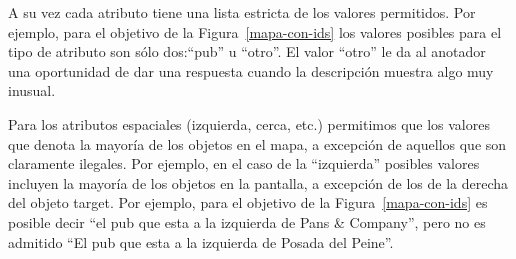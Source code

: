 A su vez cada atributo tiene una lista estricta de los valores permitidos. Por ejemplo, para el objetivo de la Figura~\ref{mapa-con-ids} los valores posibles para el tipo de atributo son s\'olo dos:``pub'' u ``otro''. El valor ``otro'' le da al anotador una oportunidad de dar una respuesta cuando la descripci\'on muestra algo muy inusual.

Para los atributos espaciales (izquierda, cerca, etc.) permitimos que los valores que denota la mayor\'{i}a de los objetos en el mapa, a excepci\'on de aquellos que son claramente ilegales. Por ejemplo, en el caso de la ``izquierda'' posibles valores incluyen la mayor\'{i}a de los objetos en la pantalla, a excepci\'on de los de la derecha del objeto target. Por ejemplo, para el objetivo de la Figura~\ref{mapa-con-ids} es posible decir ``el pub que esta a la izquierda de Pans \& Company'', pero no es admitido ``El pub que esta a la izquierda de Posada del Peine''.
%






